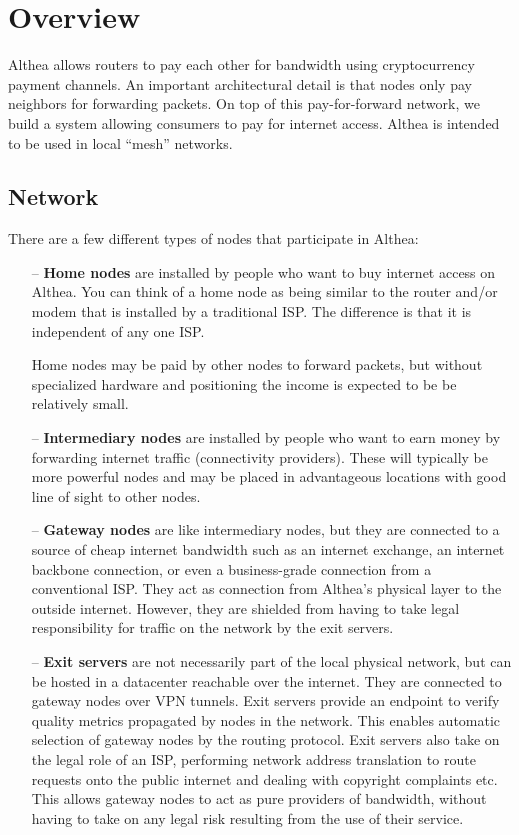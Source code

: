 \documentclass[11pt]{article}
\begin{document}
\tableofcontents

\section{Overview}
\label{sec:overview}
Althea allows routers to pay each other for bandwidth using cryptocurrency payment channels. An important architectural detail is that nodes only pay neighbors for forwarding packets. On top of this pay-for-forward network, we build a system allowing consumers to pay for internet access. Althea is intended to be used in local ``mesh'' \cite{wcn} networks.

\subsection{Network}

There are a few different types of nodes that participate in Althea:

\begin{itemize}
\item[--] \textbf{Home nodes} are installed by people who want to buy internet access on Althea. You can think of a home node as being similar to the router and/or modem that is installed by a traditional ISP. The difference is that it is independent of any one ISP.
 
Home nodes may be paid by other nodes to forward packets, but without specialized hardware and positioning the income is expected to be be relatively small.

\item[--] \textbf{Intermediary nodes} are installed by people who want to earn money by forwarding internet traffic (connectivity providers). These will typically be more powerful nodes and may be placed in advantageous locations with good line of sight to other nodes. 

\item[--] \textbf{Gateway nodes} are like intermediary nodes, but they are connected to a source of cheap internet bandwidth such as an internet exchange, an internet backbone connection, or even a business-grade connection from a conventional ISP. They act as connection from Althea’s physical layer to the outside internet. However, they are shielded from having to take legal responsibility for traffic on the network by the exit servers.

\item[--] \textbf{Exit servers} are not necessarily part of the local physical network, but can be hosted in a datacenter reachable over the internet. They are connected to gateway nodes over VPN tunnels. Exit servers provide an endpoint to verify quality metrics propagated by nodes in the network. This enables automatic selection of gateway nodes by the routing protocol. Exit servers also take on the legal role of an ISP, performing network address translation to route requests onto the public internet and dealing with copyright complaints etc. This allows gateway nodes to act as pure providers of bandwidth, without having to take on any legal risk resulting from the use of their service.

\end{itemize}
\end{document}

